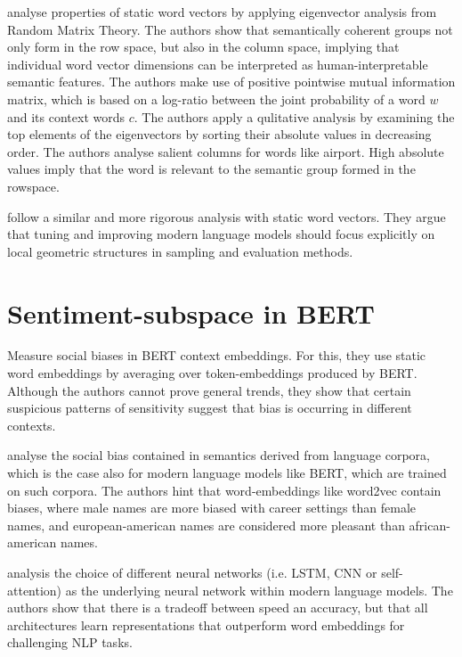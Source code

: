 \documentclass[a4paper,12pt,twoside,openright]{report}
\begin{document}
\cite{shin18} analyse properties of static word vectors by applying eigenvector analysis from Random Matrix Theory.
The authors show that semantically coherent groups not only form in the row space, but also in the column space, implying that individual word vector dimensions can be interpreted as human-interpretable semantic features.
The authors make use of positive pointwise mutual information matrix, which is based on a log-ratio between the joint probability of a word $w$ and its context words $c$.
The authors apply a qulitative analysis by examining the top elements of the eigenvectors by sorting their absolute values in decreasing order.
The authors analyse salient columns for words like airport.
High absolute values imply that the word is relevant to the semantic group formed in the rowspace.

\cite{whitaker19} follow a similar and more rigorous analysis with static word vectors. 
They argue that tuning and improving modern language models should focus explicitly on local geometric structures in sampling and evaluation methods.

\section{Sentiment-subspace in BERT}

\cite{may19} Measure social biases in BERT context embeddings.
For this, they use static word embeddings by averaging over token-embeddings produced by BERT.
Although the authors cannot prove general trends, they show that certain suspicious patterns of sensitivity suggest that bias is occurring in different contexts.

\cite{caliskan19} analyse the social bias contained in semantics derived from language corpora, which is the case also for modern language models like BERT, which are trained on such corpora.
The authors hint that word-embeddings like word2vec contain biases, where male names are more biased with career settings than female names, and european-american names are considered more pleasant than african-american names.

\cite{peters18} analysis the choice of different neural networks (i.e. LSTM, CNN or self-attention) as the underlying neural network within modern language models.
The authors show that there is a tradeoff between speed an accuracy, but that all architectures learn representations that outperform word embeddings for challenging NLP tasks.
\end{document}
